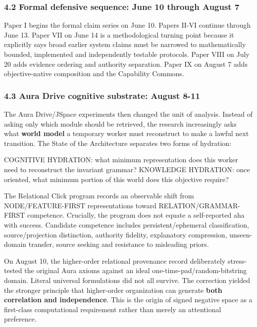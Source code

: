 \documentclass[
  10pt,
  letterpaper,
]{article}
\newenvironment{Shaded}{}{}
\newcommand{\NormalTok}[1]{#1}
\begin{document}
\subsubsection{4.2 Formal defensive sequence: June 10 through August
7}\label{42-formal-defensive-sequence-june-10-through-august-7}

Paper I begins the formal claim series on June 10. Papers II-VI continue
through June 13. Paper VII on June 14 is a methodological turning point
because it explicitly says broad earlier system claims must be narrowed
to mathematically bounded, implemented and independently testable
protocols. Paper VIII on July 20 adds evidence ordering and authority
separation. Paper IX on August 7 adds objective-native composition and
the Capability Commons.

\subsubsection{4.3 Aura Drive cognitive substrate: August
8-11}\label{43-aura-drive-cognitive-substrate-august-8-11}

The Aura Drive/JSpace experiments then changed the unit of analysis.
Instead of asking only which module should be retrieved, the research
increasingly asks what \textbf{world model} a temporary worker must
reconstruct to make a lawful next transition. The State of the
Architecture separates two forms of hydration:

\begin{Shaded}
\begin{Highlighting}[]
\NormalTok{COGNITIVE HYDRATION: what minimum representation does this worker need to reconstruct the invariant grammar?}
\NormalTok{KNOWLEDGE HYDRATION: once oriented, what minimum portion of this world does this objective require?}
\end{Highlighting}
\end{Shaded}

The Relational Click program records an observable shift from
NODE/FEATURE-FIRST representations toward RELATION/GRAMMAR-FIRST
competence. Crucially, the program does not equate a self-reported
\textquotesingle aha\textquotesingle{} with success. Candidate
competence includes persistent/ephemeral classification,
source/projection distinction, authority fidelity, explanatory
compression, unseen-domain transfer, source seeking and resistance to
misleading priors.

On August 10, the higher-order relational provenance record deliberately
stress-tested the original Aura axioms against an ideal
one-time-pad/random-bitstring domain. Literal universal formulations did
not all survive. The correction yielded the stronger principle that
higher-order organization can generate \textbf{both correlation and
independence}. This is the origin of signed negative space as a
first-class computational requirement rather than merely an attentional
preference.
\end{document}
